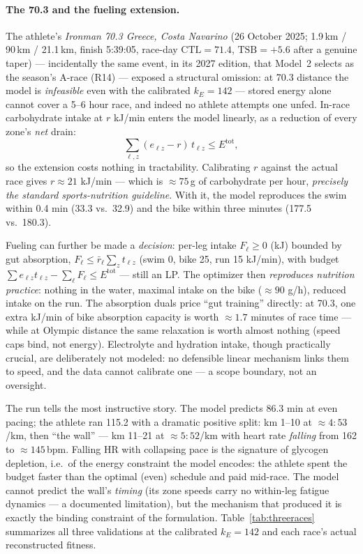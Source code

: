 \documentclass[11pt,a4paper]{article}
\begin{document}
\paragraph{The 70.3 and the fueling extension.} The athlete's
\emph{Ironman 70.3 Greece, Costa Navarino} (26 October 2025;
1.9\,km / 90\,km / 21.1\,km, finish 5:39:05, race-day $\text{CTL} = 71.4$,
$\text{TSB} = +5.6$ after a genuine taper) --- incidentally the same event, in
its 2027 edition, that Model~2 selects as the season's A-race (R14) --- exposed
a structural omission: at 70.3 distance the model is \emph{infeasible} even with
the calibrated $k_E = 142$ --- stored energy alone cannot cover a 5--6 hour
race, and indeed no athlete attempts one unfed. In-race carbohydrate intake at
$r$ kJ/min enters the model linearly, as a reduction of every zone's
\emph{net} drain:
\[
\sum_{\ell,z} (e_{\ell z} - r)\, t_{\ell z} \le E^{\text{tot}},
\]
so the extension costs nothing in tractability. Calibrating $r$ against the
actual race gives $r \approx 21$ kJ/min --- which is $\approx 75$\,g of
carbohydrate per hour, \emph{precisely the standard sports-nutrition
guideline}. With it, the model reproduces the swim within 0.4 min (33.3 vs.\
32.9) and the bike within three minutes (177.5 vs.\ 180.3).

Fueling can further be made a \emph{decision}: per-leg intake $F_\ell \ge 0$
(kJ) bounded by gut absorption, $F_\ell \le \bar r_\ell \sum_z t_{\ell z}$
(swim 0, bike 25, run 15 kJ/min), with budget
$\sum e_{\ell z} t_{\ell z} - \sum_\ell F_\ell \le E^{\text{tot}}$ --- still an
LP. The optimizer then \emph{reproduces nutrition practice}: nothing in the
water, maximal intake on the bike ($\approx 90$ g/h), reduced intake on the
run. The absorption duals price ``gut training'' directly: at 70.3, one extra
kJ/min of bike absorption capacity is worth $\approx 1.7$ minutes of race time
--- while at Olympic distance the same relaxation is worth almost nothing (speed
caps bind, not energy). Electrolyte and hydration intake, though practically
crucial, are deliberately not modeled: no defensible linear mechanism links
them to speed, and the data cannot calibrate one --- a scope boundary, not an
oversight.

The run tells the most instructive story. The model predicts 86.3 min at even
pacing; the athlete ran 115.2 with a dramatic positive split: km 1--10 at
$\approx 4{:}53$/km, then ``the wall'' --- km 11--21 at $\approx 5{:}52$/km with
heart rate \emph{falling} from 162 to $\approx 145$\,bpm. Falling HR with
collapsing pace is the signature of glycogen depletion, i.e.\ of the energy
constraint the model encodes: the athlete spent the budget faster than the
optimal (even) schedule and paid mid-race. The model cannot predict the wall's
\emph{timing} (its zone speeds carry no within-leg fatigue dynamics --- a
documented limitation), but the mechanism that produced it is exactly the
binding constraint of the formulation. Table~\ref{tab:threeraces} summarizes
all three validations at the calibrated $k_E = 142$ and each race's actual
reconstructed fitness.
\end{document}
